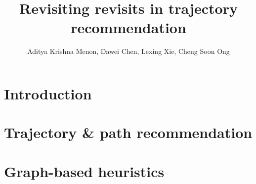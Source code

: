 \documentclass[sigconf]{acmart}
\begin{document}
\title{Revisiting revisits in trajectory recommendation}

\author{Aditya Krishna Menon, Dawei Chen, Lexing Xie, Cheng Soon Ong}

\begin{abstract}

\end{abstract}

%
%


\maketitle

\section{Introduction}


\section{Trajectory \& path recommendation}
\label{sec:background}


\section{Graph-based heuristics}
\label{sec:heuristics}

\end{document}
